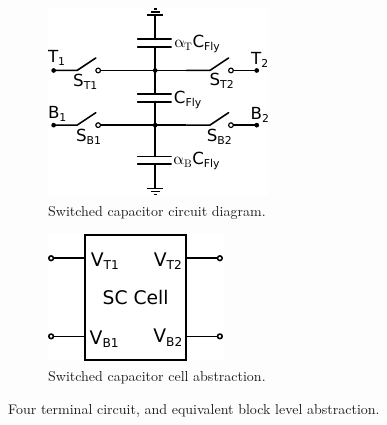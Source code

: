 \documentclass[conference]{IEEEtran}
\begin{document}
	\begin{figure}
		\centering
		\begin{subfigure}{0.45\linewidth}
			\includegraphics[width=\textwidth]{Figures/SCCell.pdf}
			\caption{Switched capacitor circuit diagram.}
			\label{Fig:SCCell}	
		\end{subfigure}
	\hfill
		\begin{subfigure}{0.45\linewidth}
			\includegraphics[width=\textwidth]{Figures/SCCell_Abs.pdf}
			\caption{Switched capacitor cell abstraction.}
			\label{Fig:SCCell_Abs}	
		\end{subfigure}
	\caption{Four terminal circuit, and equivalent block level abstraction.}
	\end{figure}
	
\end{document}
